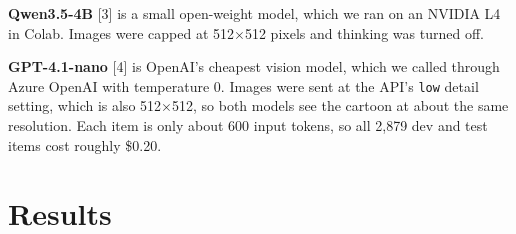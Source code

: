 \documentclass[10pt]{article}
\begin{document}
\textbf{Qwen3.5-4B} [3] is a small open-weight model, which we ran on an NVIDIA L4 in Colab. Images were capped at 512$\times$512 pixels and thinking was turned off. \par

\textbf{GPT-4.1-nano} [4] is OpenAI's cheapest vision model, which we called through Azure OpenAI with temperature 0. Images were sent at the API's \texttt{low} detail setting, which is also 512$\times$512, so both models see the cartoon at about the same resolution. Each item is only about 600 input tokens, so all 2,879 dev and test items cost roughly \$0.20. \par

\section{Results}
\end{document}
